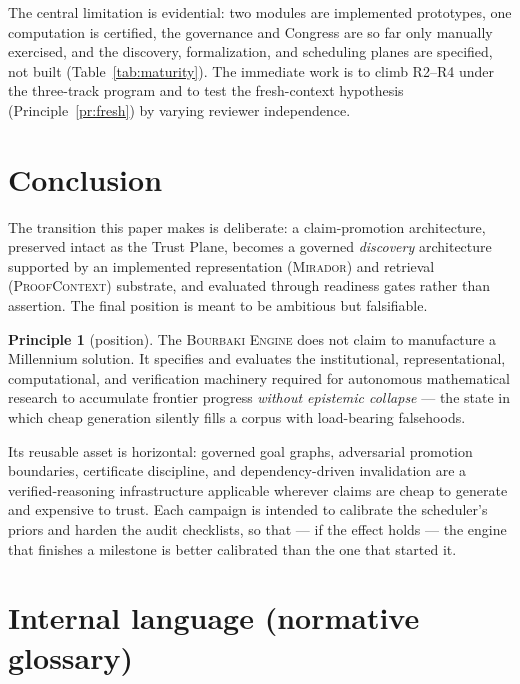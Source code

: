 \documentclass[11pt]{amsart}
\theoremstyle{definition}
\newtheorem{principle}{Principle}
\theoremstyle{remark}
\newcommand{\engine}{\textsc{Bourbaki Engine}}
\newcommand{\mirador}{\textsc{Mirador}}
\newcommand{\pc}{\textsc{ProofContext}}
\begin{document}
The central limitation is evidential: two modules are implemented prototypes, one
computation is certified, the governance and Congress are so far only manually
exercised, and the discovery, formalization, and scheduling planes are specified,
not built (Table~\ref{tab:maturity}). The immediate work is to climb R2--R4 under
the three-track program and to test the fresh-context hypothesis
(Principle~\ref{pr:fresh}) by varying reviewer independence.

\section{Conclusion}\label{sec:conclusion}

The transition this paper makes is deliberate: a claim-promotion architecture,
preserved intact as the Trust Plane, becomes a governed \emph{discovery}
architecture supported by an implemented representation (\mirador{}) and
retrieval (\pc{}) substrate, and evaluated through readiness gates rather than
assertion. The final position is meant to be ambitious but falsifiable.

\begin{principle}[position]\label{pr:position}
The \engine{} does not claim to manufacture a Millennium solution. It specifies
and evaluates the institutional, representational, computational, and
verification machinery required for autonomous mathematical research to
accumulate frontier progress \emph{without epistemic collapse} --- the state in
which cheap generation silently fills a corpus with load-bearing falsehoods.
\end{principle}

Its reusable asset is horizontal: governed goal graphs, adversarial promotion
boundaries, certificate discipline, and dependency-driven invalidation are a
verified-reasoning infrastructure applicable wherever claims are cheap to
generate and expensive to trust. Each campaign is intended to calibrate the
scheduler's priors and harden the audit checklists, so that --- if the effect
holds --- the engine that finishes a milestone is better calibrated than the one
that started it.

\appendix
\section{Internal language (normative glossary)}\label{app:language}
\end{document}

